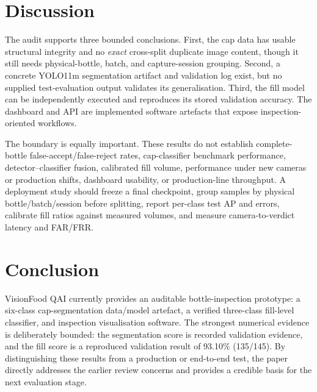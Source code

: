 \documentclass[conference]{../IEEE_paper/IEEEtran}
\begin{document}
\section{Discussion}
The audit supports three bounded conclusions. First, the cap data has usable structural integrity and no \emph{exact} cross-split duplicate image content, though it still needs physical-bottle, batch, and capture-session grouping. Second, a concrete YOLO11m segmentation artifact and validation log exist, but no supplied test-evaluation output validates its generalisation. Third, the fill model can be independently executed and reproduces its stored validation accuracy. The dashboard and API are implemented software artefacts that expose inspection-oriented workflows.

The boundary is equally important. These results do not establish complete-bottle false-accept/false-reject rates, cap-classifier benchmark performance, detector--classifier fusion, calibrated fill volume, performance under new cameras or production shifts, dashboard usability, or production-line throughput. A deployment study should freeze a final checkpoint, group samples by physical bottle/batch/session before splitting, report per-class test AP and errors, calibrate fill ratios against measured volumes, and measure camera-to-verdict latency and FAR/FRR.

\section{Conclusion}
VisionFood QAI currently provides an auditable bottle-inspection prototype: a six-class cap-segmentation data/model artefact, a verified three-class fill-level classifier, and inspection visualisation software. The strongest numerical evidence is deliberately bounded: the segmentation score is recorded validation evidence, and the fill score is a reproduced validation result of 93.10\% (135/145). By distinguishing these results from a production or end-to-end test, the paper directly addresses the earlier review concerns and provides a credible basis for the next evaluation stage.

\printbibliography
\end{document}
